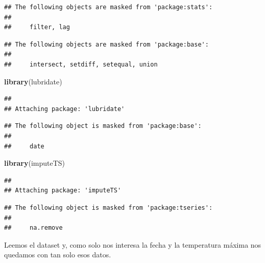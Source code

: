 \documentclass[]{article}
\newenvironment{Shaded}{\begin{snugshade}}{\end{snugshade}}
\newcommand{\KeywordTok}[1]{\textcolor[rgb]{0.13,0.29,0.53}{\textbf{#1}}}
\newcommand{\DataTypeTok}[1]{\textcolor[rgb]{0.13,0.29,0.53}{#1}}
\newcommand{\StringTok}[1]{\textcolor[rgb]{0.31,0.60,0.02}{#1}}
\newcommand{\OtherTok}[1]{\textcolor[rgb]{0.56,0.35,0.01}{#1}}
\newcommand{\OperatorTok}[1]{\textcolor[rgb]{0.81,0.36,0.00}{\textbf{#1}}}
\newcommand{\NormalTok}[1]{#1}
\begin{document}
\begin{verbatim}
## The following objects are masked from 'package:stats':
## 
##     filter, lag
\end{verbatim}

\begin{verbatim}
## The following objects are masked from 'package:base':
## 
##     intersect, setdiff, setequal, union
\end{verbatim}

\begin{Shaded}
\begin{Highlighting}[]
\KeywordTok{library}\NormalTok{(lubridate)}
\end{Highlighting}
\end{Shaded}

\begin{verbatim}
## 
## Attaching package: 'lubridate'
\end{verbatim}

\begin{verbatim}
## The following object is masked from 'package:base':
## 
##     date
\end{verbatim}

\begin{Shaded}
\begin{Highlighting}[]
\KeywordTok{library}\NormalTok{(imputeTS)}
\end{Highlighting}
\end{Shaded}

\begin{verbatim}
## 
## Attaching package: 'imputeTS'
\end{verbatim}

\begin{verbatim}
## The following object is masked from 'package:tseries':
## 
##     na.remove
\end{verbatim}

Leemos el dataset y, como solo nos interesa la fecha y la temperatura
máxima nos quedamos con tan solo esos datos.

\begin{Shaded}
\end{Shaded}
\end{document}
